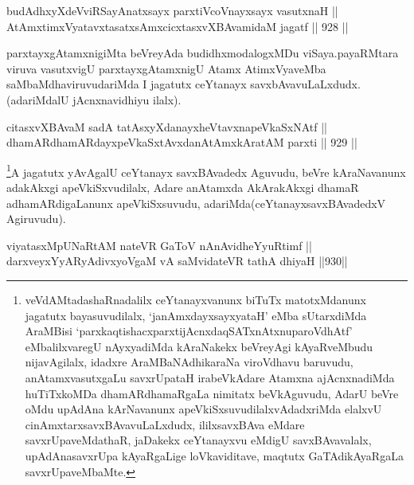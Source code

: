 \begin{shl}
budAdhxyXdeVviRSayAnatxsayx parxtiVcoV\s nayxsayx vasutxnaH || \\
AtAmxtimxVyatavxtasatxsAmxcicxtasxvXBAvamidaM jagatf \hfill || 928 ||  
\end{shl}

\begin{artha}
parxtayxgAtamxnigiMta beVreyAda budidhxmodalogxMDu viSaya.\break payaRMtara viruva vasutxvigU parxtayxgAtamxnigU Atamx AtimxVyaveMba saMbaMdhaviruvudariMda I jagatutx ceYtanayx savxbAvavuLaLxdudx.\break (adariMdalU jAcnxnavidhiyu ilalx).
\end{artha}


\begin{shl}
citasxvXBAvaM sadA tatAsxyXdanayxheVtavxnapeVkaSxNAtf ||  \\
dhamARdhamARdayxpeVkaSxtAvxdanAtAmxkAratAM parxti \hfill || 929 ||  
\end{shl}

\begin{artha}
\footnote{veVdAMtadashaRnadalilx ceYtanayxvanunx biTuTx matotxMdanunx jagatutx bayasuvudilalx, `janAmxdayxsayxyataH' eMba sUtarxdiMda AraMBisi `parxkaqtishacxparxtijAcnxdaqSATxnAtxnuparoVdhAtf' eMbalilxvaregU nAyxyadiMda kAraNakekx beVreyAgi kAyaRveMbudu nijavAgilalx, idadxre AraMBaNAdhikaraNa viroVdhavu baruvudu, anAtamxvasutxgaLu savxrUpataH irabeVkAdare Atamxna ajAcnxnadiMda huTiTxkoMDa dhamARdhamaRgaLa nimitatx beVkAguvudu, AdarU beVre oMdu upAdAna kArNavanunx apeVkiSxsuvudilalxvAdadxriMda elalxvU cinAmxtarxsavxBAvavuLaLxdudx, ililxsavxBAva eMdare savxrUpaveMdathaR, jaDakekx ceYtanayxvu eMdigU savxBAvavalalx, upAdAnasavxrUpa kAyaRgaLige loVkaviditave, maqtutx GaTAdikAyaRgaLa savxrUpaveMbaMte.}A jagatutx yAvAgalU ceYtanayx savxBAvadedx Aguvudu, beVre kAraNavanunx adakAkxgi apeVkiSxvudilalx, Adare anAtamxda AkArakAkxgi dhamaR adhamARdigaLanunx apeVkiSxsuvudu, adariMda\break (ceYtanayxsavxBAvadedxV Agiruvudu).
\end{artha}


\begin{shl}
viyatasxMpUNaRtAM nateVR GaToV nAnAvidheYyuRtimf || \\
darxveyxYyARyAdivxyoVgaM vA saMvidateVR tathA dhiyaH \hfill ||930||  
\end{shl}

